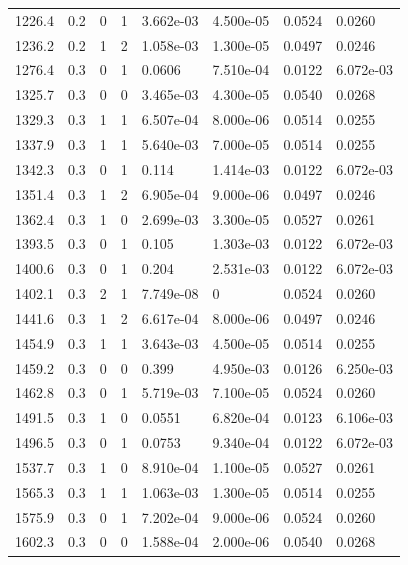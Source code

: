 \documentclass[preview]{standalone}
\begin{document}
{{{\begin{tabular}{L{1.2cm}C{1.2cm} C{0.3cm}C{0.5cm} C{1.4cm}C{1.4cm} C{1.4cm}C{1.4cm}}
  1226.4  &   0.2  & 0     &  1 &  3.662e-03  & 4.500e-05  & 0.0524 &  0.0260   \\ 
  1236.2  &   0.2  & 1     &  2 &  1.058e-03  & 1.300e-05  & 0.0497 &  0.0246   \\ 
  1276.4  &   0.3  & 0     &  1 &  0.0606  & 7.510e-04  & 0.0122 &  6.072e-03   \\ 
  1325.7  &   0.3  & 0     &  0 &  3.465e-03  & 4.300e-05  & 0.0540 &  0.0268   \\ 
  1329.3  &   0.3  & 1     &  1 &  6.507e-04  & 8.000e-06  & 0.0514 &  0.0255   \\ 
  1337.9  &   0.3  & 1     &  1 &  5.640e-03  & 7.000e-05  & 0.0514 &  0.0255   \\ 
  1342.3  &   0.3  & 0     &  1 &  0.114  & 1.414e-03  & 0.0122 &  6.072e-03   \\ 
  1351.4  &   0.3  & 1     &  2 &  6.905e-04  & 9.000e-06  & 0.0497 &  0.0246   \\ 
  1362.4  &   0.3  & 1     &  0 &  2.699e-03  & 3.300e-05  & 0.0527 &  0.0261   \\ 
  1393.5  &   0.3  & 0     &  1 &  0.105  & 1.303e-03  & 0.0122 &  6.072e-03   \\ 
  1400.6  &   0.3  & 0     &  1 &  0.204  & 2.531e-03  & 0.0122 &  6.072e-03   \\ 
  1402.1  &   0.3  & 2     &  1 &  7.749e-08  & 0  & 0.0524 &  0.0260   \\ 
  1441.6  &   0.3  & 1     &  2 &  6.617e-04  & 8.000e-06  & 0.0497 &  0.0246   \\ 
  1454.9  &   0.3  & 1     &  1 &  3.643e-03  & 4.500e-05  & 0.0514 &  0.0255   \\ 
  1459.2  &   0.3  & 0     &  0 &  0.399  & 4.950e-03  & 0.0126 &  6.250e-03   \\ 
  1462.8  &   0.3  & 0     &  1 &  5.719e-03  & 7.100e-05  & 0.0524 &  0.0260   \\ 
  1491.5  &   0.3  & 1     &  0 &  0.0551  & 6.820e-04  & 0.0123 &  6.106e-03   \\ 
  1496.5  &   0.3  & 0     &  1 &  0.0753  & 9.340e-04  & 0.0122 &  6.072e-03   \\ 
  1537.7  &   0.3  & 1     &  0 &  8.910e-04  & 1.100e-05  & 0.0527 &  0.0261   \\ 
  1565.3  &   0.3  & 1     &  1 &  1.063e-03  & 1.300e-05  & 0.0514 &  0.0255   \\ 
  1575.9  &   0.3  & 0     &  1 &  7.202e-04  & 9.000e-06  & 0.0524 &  0.0260   \\ 
  1602.3  &   0.3  & 0     &  0 &  1.588e-04  & 2.000e-06  & 0.0540 &  0.0268   \\ 

\end{tabular}}}}
\end{document}
